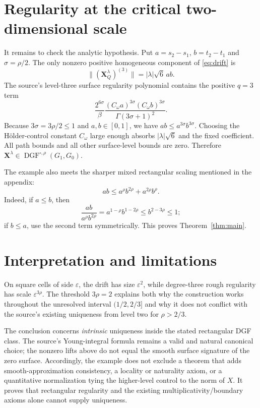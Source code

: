 \documentclass[11pt]{article}
\theoremstyle{remark}
\newcommand{\DGF}{\operatorname{DGF}}
\begin{document}
\section{Regularity at the critical two-dimensional scale}

It remains to check the analytic hypothesis.  Put $a=s_2-s_1$, $b=t_2-t_1$
and $\sigma=\rho/2$.  The only nonzero positive homogeneous component of
\eqref{eq:drift} is
\[
 \| (\mathbf X_Q^\lambda)^{(3)}\|
 =|\lambda|\sqrt6\,ab.
\]
The source's level-three surface regularity polynomial contains the positive
$q=3$ term
\[
 \frac{2^{6\sigma}}{\beta}
 \frac{(C_\omega a)^{3\sigma}(C_\omega b)^{3\sigma}}
      {\Gamma(3\sigma+1)^2}.
\]
Because $3\sigma=3\rho/2\le1$ and $a,b\in[0,1]$, we have
$ab\le a^{3\sigma}b^{3\sigma}$.  Choosing the Hölder-control constant
$C_\omega$ large enough absorbs $|\lambda|\sqrt6$ and the fixed coefficient.
All path bounds and all other surface-level bounds are zero.  Therefore
$\mathbf X^\lambda\in\DGF^{\square,\rho}(G_1,G_0)$.

The example also meets the sharper mixed rectangular scaling mentioned in
the appendix:
\begin{equation}\label{eq:strong}
 ab\le a^\rho b^{2\rho}+a^{2\rho}b^\rho.
\end{equation}
Indeed, if $a\le b$, then
\[
 \frac{ab}{a^\rho b^{2\rho}}
 =a^{1-\rho}b^{1-2\rho}
 \le b^{2-3\rho}\le1;
\]
if $b\le a$, use the second term symmetrically.  This proves
Theorem~\ref{thm:main}.

\section{Interpretation and limitations}

On square cells of side $\varepsilon$, the drift has size
$\varepsilon^2$, while degree-three rough regularity has scale
$\varepsilon^{3\rho}$.  The threshold $3\rho=2$ explains both why the
construction works throughout the unresolved interval $(1/2,2/3]$ and why
it does not conflict with the source's existing uniqueness from level two
for $\rho>2/3$.

The conclusion concerns \emph{intrinsic} uniqueness inside the stated
rectangular DGF class.  The source's Young-integral formula remains a valid
and natural canonical choice; the nonzero lifts above do not equal the smooth
surface signature of the zero surface.  Accordingly, the example does not
exclude a theorem that adds smooth-approximation consistency, a locality or
naturality axiom, or a quantitative normalization tying the higher-level
control to the norm of $X$.  It proves that rectangular regularity and the
existing multiplicativity/boundary axioms alone cannot supply uniqueness.
\end{document}
